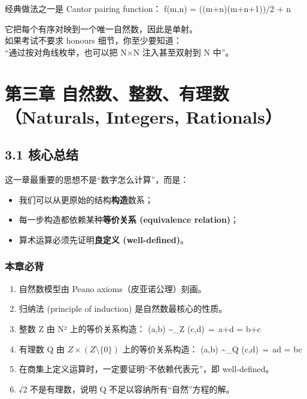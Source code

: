 \documentclass[
  11pt,
]{article}
\providecommand{\tightlist}{%
  \setlength{\itemsep}{0pt}\setlength{\parskip}{0pt}}
\begin{document}
经典做法之一是 Cantor pairing function： f(m,n) = ((m+n)(m+n+1))/2 + n

它把每个有序对映到一个唯一自然数，因此是单射。\\
如果考试不要求 honours 细节，你至少要知道：\\
``通过按对角线枚举，也可以把 N×N 注入甚至双射到 N 中''。

\section{第三章 自然数、整数、有理数（Naturals, Integers,
Rationals）}\label{ux7b2cux4e09ux7ae0-ux81eaux7136ux6570ux6574ux6570ux6709ux7406ux6570naturals-integers-rationals}

\subsection{3.1 核心总结}\label{ux6838ux5fc3ux603bux7ed3-2}

这一章最重要的思想不是``数字怎么计算''，而是：

\begin{itemize}
\tightlist
\item
  我们可以从更原始的结构\textbf{构造}数系；
\item
  每一步构造都依赖某种\textbf{等价关系 (equivalence relation)}；
\item
  算术运算必须先证明\textbf{良定义 (well-defined)}。
\end{itemize}

\subsubsection{本章必背}\label{ux672cux7ae0ux5fc5ux80cc-1}

\begin{enumerate}
\def\labelenumi{\arabic{enumi}.}
\tightlist
\item
  自然数模型由 Peano axioms（皮亚诺公理）刻画。\\
\item
  归纳法 (principle of induction) 是自然数最核心的性质。\\
\item
  整数 Z 由 N² 上的等价关系构造： (a,b) \textasciitilde\_Z (c,d) ⇔ a+d =
  b+c
\item
  有理数 Q 由 \(Z\times (Z\setminus\{0\})\) 上的等价关系构造： (a,b)
  \textasciitilde\_Q (c,d) ⇔ ad = bc
\item
  在商集上定义运算时，一定要证明``不依赖代表元''，即 well-defined。
\item
  √2 不是有理数，说明 Q 不足以容纳所有``自然''方程的解。
\end{enumerate}
\end{document}
